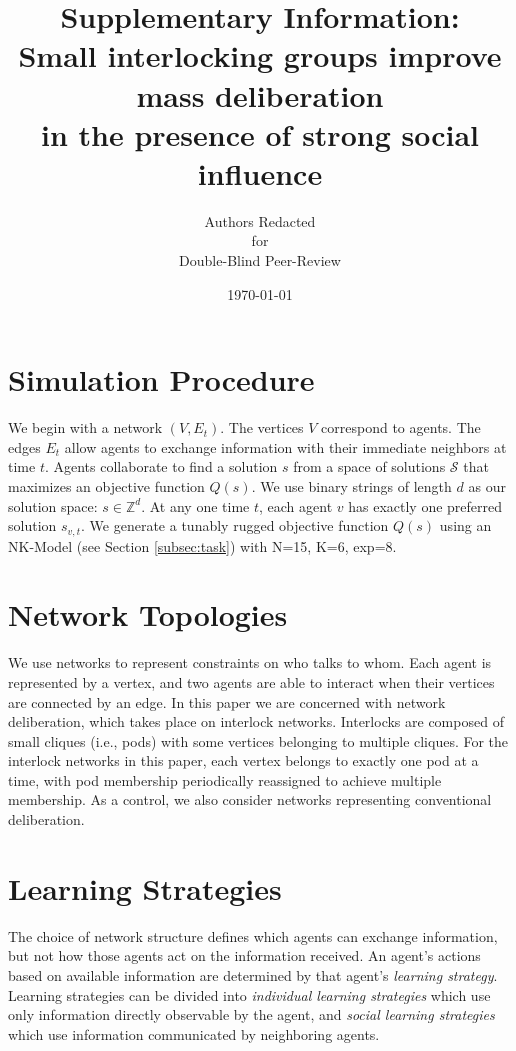 \documentclass[twocolumn,10pt]{article}
\title{Supplementary Information: \\
Small interlocking groups improve mass deliberation\\in the presence of strong social influence}
\author{
Authors Redacted \\
for \\
Double-Blind Peer-Review
}
\date{\today}
\begin{document}
\maketitle

\section{Simulation Procedure}
We begin with a network $(V,E_t)$. The vertices $V$ correspond to agents. The edges $E_t$ allow agents to exchange information with their immediate neighbors at time $t$.
Agents collaborate to find a solution $s$ from a space of solutions $\mathcal{S}$ that maximizes an objective function $Q(s)$.
We use binary strings of length $d$ as our solution space: $s \in \mathbb{Z}^d$.
At any one time $t$, each agent $v$ has exactly one preferred solution $s_{v,t}$.
We generate a tunably rugged objective function $Q(s)$ using an NK-Model \cite{kauffman_towards_1987} (see Section \ref{subsec:task}) with N=15, K=6, exp=8.

\section{Network Topologies}

We use networks to represent constraints on who talks to whom. Each agent is represented by a vertex, and two agents are able to interact when their vertices are connected by an edge. In this paper we are concerned with network deliberation, which takes place on interlock networks. Interlocks are composed of small cliques (i.e., pods) with some vertices belonging to multiple cliques. For the interlock networks in this paper, each vertex belongs to exactly one pod at a time, with pod membership periodically reassigned to achieve multiple membership. As a control, we also consider networks representing conventional deliberation.


\section{Learning Strategies}
\label{sec:learning}
The choice of network structure defines which agents can exchange information, but not how those agents act on the information received. An agent's actions based on available information are determined by that agent's {\em learning strategy}. Learning strategies can be divided into {\em individual learning strategies} which use only information directly observable by the agent, and {\em social learning strategies} which use information communicated by neighboring agents.
\end{document}
